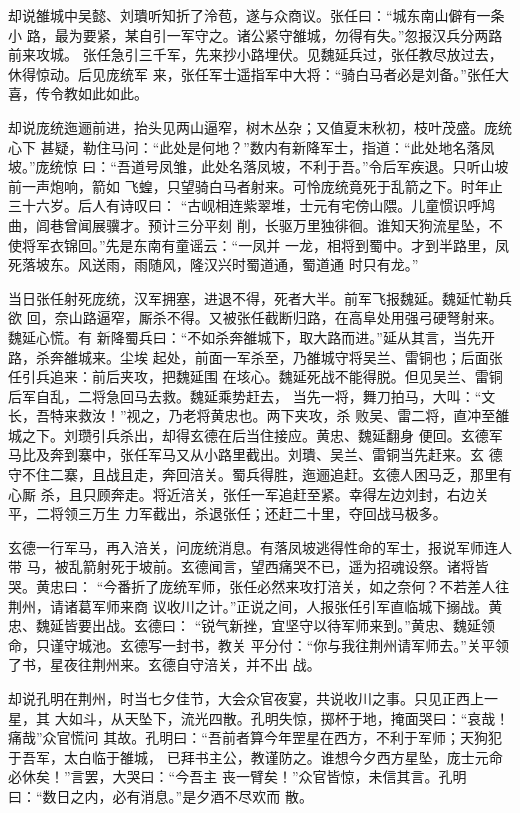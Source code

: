 却说雒城中吴懿、刘璝听知折了泠苞，遂与众商议。张任曰：“城东南山僻有一条小
路，最为要紧，某自引一军守之。诸公紧守雒城，勿得有失。”忽报汉兵分两路前来攻城。
张任急引三千军，先来抄小路埋伏。见魏延兵过，张任教尽放过去，休得惊动。后见庞统军
来，张任军士遥指军中大将：“骑白马者必是刘备。”张任大喜，传令教如此如此。

却说庞统迤逦前进，抬头见两山逼窄，树木丛杂；又值夏末秋初，枝叶茂盛。庞统心下
甚疑，勒住马问：“此处是何地？”数内有新降军士，指道：“此处地名落凤坡。”庞统惊
曰：“吾道号凤雏，此处名落凤坡，不利于吾。”令后军疾退。只听山坡前一声炮响，箭如
飞蝗，只望骑白马者射来。可怜庞统竟死于乱箭之下。时年止三十六岁。后人有诗叹曰：
“古岘相连紫翠堆，士元有宅傍山隈。儿童惯识呼鸠曲，闾巷曾闻展骥才。预计三分平刻
削，长驱万里独徘徊。谁知天狗流星坠，不使将军衣锦回。”先是东南有童谣云：“一凤并
一龙，相将到蜀中。才到半路里，凤死落坡东。风送雨，雨随风，隆汉兴时蜀道通，蜀道通
时只有龙。”

当日张任射死庞统，汉军拥塞，进退不得，死者大半。前军飞报魏延。魏延忙勒兵欲
回，奈山路逼窄，厮杀不得。又被张任截断归路，在高阜处用强弓硬弩射来。魏延心慌。有
新降蜀兵曰：“不如杀奔雒城下，取大路而进。”延从其言，当先开路，杀奔雒城来。尘埃
起处，前面一军杀至，乃雒城守将吴兰、雷铜也；后面张任引兵追来：前后夹攻，把魏延围
在垓心。魏延死战不能得脱。但见吴兰、雷铜后军自乱，二将急回马去救。魏延乘势赶去，
当先一将，舞刀拍马，大叫：“文长，吾特来救汝！”视之，乃老将黄忠也。两下夹攻，杀
败吴、雷二将，直冲至雒城之下。刘瓒引兵杀出，却得玄德在后当住接应。黄忠、魏延翻身
便回。玄德军马比及奔到寨中，张任军马又从小路里截出。刘璝、吴兰、雷铜当先赶来。玄
德守不住二寨，且战且走，奔回涪关。蜀兵得胜，迤逦追赶。玄德人困马乏，那里有心厮
杀，且只顾奔走。将近涪关，张任一军追赶至紧。幸得左边刘封，右边关平，二将领三万生
力军截出，杀退张任；还赶二十里，夺回战马极多。

玄德一行军马，再入涪关，问庞统消息。有落凤坡逃得性命的军士，报说军师连人带
马，被乱箭射死于坡前。玄德闻言，望西痛哭不已，遥为招魂设祭。诸将皆哭。黄忠曰：
“今番折了庞统军师，张任必然来攻打涪关，如之奈何？不若差人往荆州，请诸葛军师来商
议收川之计。”正说之间，人报张任引军直临城下搦战。黄忠、魏延皆要出战。玄德曰：
“锐气新挫，宜坚守以待军师来到。”黄忠、魏延领命，只谨守城池。玄德写一封书，教关
平分付：“你与我往荆州请军师去。”关平领了书，星夜往荆州来。玄德自守涪关，并不出
战。

却说孔明在荆州，时当七夕佳节，大会众官夜宴，共说收川之事。只见正西上一星，其
大如斗，从天坠下，流光四散。孔明失惊，掷杯于地，掩面哭曰：“哀哉！痛哉”众官慌问
其故。孔明曰：“吾前者算今年罡星在西方，不利于军师；天狗犯于吾军，太白临于雒城，
已拜书主公，教谨防之。谁想今夕西方星坠，庞士元命必休矣！”言罢，大哭曰：“今吾主
丧一臂矣！”众官皆惊，未信其言。孔明曰：“数日之内，必有消息。”是夕酒不尽欢而
散。

